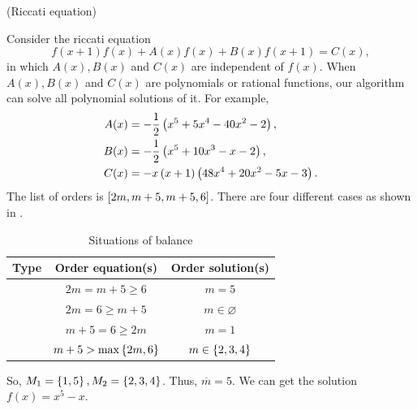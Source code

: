 \begin{example}
(Riccati equation)

Consider the riccati equation\citep{bittanti2012riccati}
\begin{equation}
    f(x+1)f(x)+A(x)f(x)+B(x)f(x+1)=C(x), \label{raeq}
\end{equation} 
in which $A(x),B(x)$ and $C(x)$ are independent of $f(x)$. When $A(x),B(x)$ and $C(x)$ are polynomials or rational functions, our algorithm can solve all polynomial solutions of it. For example, 
\begin{equation}
\begin{split}
A(x)&= -\frac{1}{2}\left(x^5+5x^4-40x^2-2\right), \\ 
B(x)&= -\frac{1}{2}\left(x^5+10x^3-x-2\right), \\ 
C(x)&= -x\left(x+1\right)\left(48x^4+20x^2-5x-3\right).
\end{split}
\end{equation}
The list of orders is $\left[2m,m+5,m+5,6\right]$. There are four different cases as shown in .

\begin{table}[H]
\centering
\caption{Situations of balance}\label{tb}
\begin{tabular}{ccc}
\hline
Type & Order equation(s) & Order solution(s)  \\ 
\hline
\BPone{}  & $2m=m+5\ge 6$            & $m=5$             \\ 
\BPone{}  & $2m=6\ge m+5$            & $m\in \varnothing$             \\ 
\BPone{}  & $m+5=6\ge 2m$            & $m=1$             \\ 
\BPtwo{}  & $m+5>\max\left\{2m,6\right\}$  & $m\in \left\{2,3,4\right\}$ \\
\hline
\end{tabular}
\end{table}
So, $M_1=\left\{1,5\right\},M_2=\left\{2,3,4\right\}$. Thus, $\overline m=5$. We can get the solution $f(x)=x^5-x$. 


\end{example}
